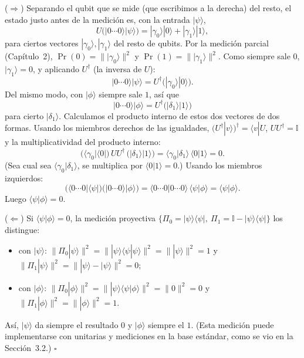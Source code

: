 \documentclass[11pt, a4paper, twoside, openright]{report}
\begin{document}
\begin{tcolorbox}[colback=gray!5!white,colframe=gray!75!black,title=\textbf{Demostración}]
($\Rightarrow$) Separando el qubit que se mide (que escribimos a la derecha) del resto, el estado justo antes de la medición es, con la entrada $|\psi\rangle$,
\[ U\big(|0\cdots0\rangle|\psi\rangle\big) = |\gamma_0\rangle|0\rangle + |\gamma_1\rangle|1\rangle, \]
para ciertos vectores $|\gamma_0\rangle, |\gamma_1\rangle$ del resto de qubits. Por la medición parcial (Capítulo~2), $\Pr(0) = \||\gamma_0\rangle\|^2$ y $\Pr(1) = \||\gamma_1\rangle\|^2$. Como siempre sale $0$, $|\gamma_1\rangle = 0$, y aplicando $U^\dagger$ (la inversa de $U$):
\[ |0\cdots0\rangle|\psi\rangle = U^\dagger\big(|\gamma_0\rangle|0\rangle\big). \]
Del mismo modo, con $|\phi\rangle$ siempre sale $1$, así que
\[ |0\cdots0\rangle|\phi\rangle = U^\dagger\big(|\delta_1\rangle|1\rangle\big) \]
para cierto $|\delta_1\rangle$. Calculamos el producto interno de estos dos vectores de dos formas. Usando los miembros derechos de las igualdades, $(U^\dagger|v\rangle)^\dagger = \langle v|U$, $UU^\dagger = \mathbb{I}$ y la multiplicatividad del producto interno:
\[ \big(\langle\gamma_0|\langle0|\big)\,U U^\dagger\,\big(|\delta_1\rangle|1\rangle\big) = \langle\gamma_0|\delta_1\rangle\,\langle0|1\rangle = 0. \]
(Sea cual sea $\langle\gamma_0|\delta_1\rangle$, se multiplica por $\langle0|1\rangle = 0$.) Usando los miembros izquierdos:
\[ \big(\langle0\cdots0|\langle\psi|\big)\big(|0\cdots0\rangle|\phi\rangle\big) = \langle0\cdots0|0\cdots0\rangle\,\langle\psi|\phi\rangle = \langle\psi|\phi\rangle. \]
Luego $\langle\psi|\phi\rangle = 0$.

($\Leftarrow$) Si $\langle\psi|\phi\rangle = 0$, la medición proyectiva $\{\Pi_0 = |\psi\rangle\langle\psi|,\ \Pi_1 = \mathbb{I} - |\psi\rangle\langle\psi|\}$ los distingue:
\begin{itemize}
    \item con $|\psi\rangle$: $\|\Pi_0|\psi\rangle\|^2 = \||\psi\rangle\langle\psi|\psi\rangle\|^2 = \||\psi\rangle\|^2 = 1$ y $\|\Pi_1|\psi\rangle\|^2 = \||\psi\rangle - |\psi\rangle\|^2 = 0$;
    \item con $|\phi\rangle$: $\|\Pi_0|\phi\rangle\|^2 = \||\psi\rangle\langle\psi|\phi\rangle\|^2 = \|0\|^2 = 0$ y $\|\Pi_1|\phi\rangle\|^2 = \||\phi\rangle\|^2 = 1$.
\end{itemize}
Así, $|\psi\rangle$ da siempre el resultado $0$ y $|\phi\rangle$ siempre el $1$. (Esta medición puede implementarse con unitarias y mediciones en la base estándar, como se vio en la Sección~3.2.) \hfill $\square$
\end{tcolorbox}
\end{document}

